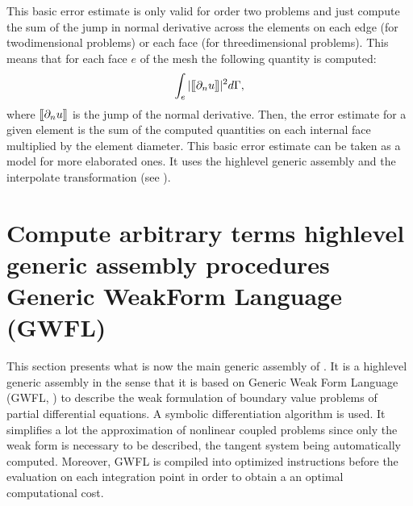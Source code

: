 \documentclass[a4paper,11pt,english]{sphinxmanual}
\begin{document}
This basic error estimate is only valid for order two problems and just compute
the sum of the jump in normal derivative across the elements on each edge (for
two\sphinxhyphen{}dimensional problems) or each face (for three\sphinxhyphen{}dimensional problems). This
means that for each face \(e\) of the mesh the following quantity is
computed:
\begin{equation*}
\begin{split}\int_e |\hspace{0.01em}[\hspace{-0.12em}[
\partial_n u ]\hspace{-0.12em}]\hspace{0.01em}|^2 d \Gamma,\end{split}
\end{equation*}
where \([\hspace{-0.12em}[\partial_n u]\hspace{-0.12em}]\) is the jump of the normal derivative. Then, the error estimate for a given element is the sum of the computed quantities on each internal face multiplied by the element diameter. This basic error estimate can be taken as a model for more elaborated ones. It uses the high\sphinxhyphen{}level generic assembly and the  interpolate transformation (see {\hyperref[\detokenize{userdoc/gasm_high:ud-gasm-high-inter-elt-disc}]{}}).

\ignorespaces 

\chapter{Compute arbitrary terms \sphinxhyphen{} high\sphinxhyphen{}level generic assembly procedures \sphinxhyphen{} Generic Weak\sphinxhyphen{}Form Language (GWFL)}
\label{\detokenize{userdoc/gasm_high:compute-arbitrary-terms-high-level-generic-assembly-procedures-generic-weak-form-language-gwfl}}\label{\detokenize{userdoc/gasm_high:ud-gasm-high}}\label{\detokenize{userdoc/gasm_high:index-0}}\label{\detokenize{userdoc/gasm_high::doc}}
This section presents what is now the main generic assembly of . It is a high\sphinxhyphen{}level generic assembly in the sense that it is based on Generic Weak Form Language (GWFL, ) to describe the weak formulation of boundary value problems of partial differential equations. A symbolic differentiation algorithm is used. It simplifies a lot the approximation of nonlinear coupled problems since only the weak form is necessary to be described, the tangent system being automatically computed. Moreover, GWFL is compiled into optimized instructions before the evaluation on each integration point in order to obtain a an optimal computational cost.
\end{document}
